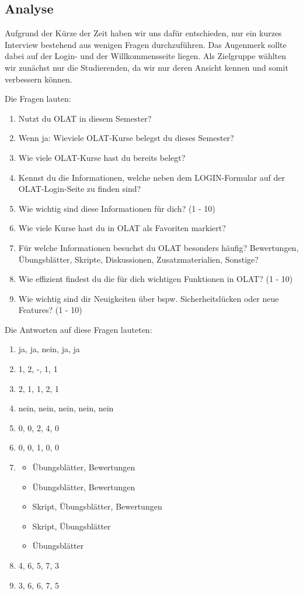 \documentclass[a4paper,10pt]{article}
\begin{document}
\kopf
\renewcommand{\figurename}{Figure}


\subsection{Analyse}
Aufgrund der Kürze der Zeit haben wir uns dafür entschieden, nur ein kurzes Interview bestehend aus wenigen Fragen durchzuführen. Das Augenmerk sollte dabei auf der Login- und der Willkommensseite liegen. Als Zielgruppe wählten wir zunächst nur die Studierenden, da wir nur deren Ansicht kennen und somit verbessern können.

Die Fragen lauten:
\begin{enumerate}
\item Nutzt du OLAT in diesem Semester?
\item Wenn ja: Wieviele OLAT-Kurse belegst du dieses Semester?
\item Wie viele OLAT-Kurse hast du bereits belegt?
\item Kennst du die Informationen, welche neben dem LOGIN-Formular auf der OLAT-Login-Seite zu finden sind?
\item Wie wichtig sind diese Informationen für dich? (1 - 10)
\item Wie viele Kurse hast du in OLAT als Favoriten markiert?
\item Für welche Informationen besuchst du OLAT besonders häufig? Bewertungen, Übungsblätter, Skripte, Diskussionen, Zusatzmaterialien, Sonstige?
\item Wie effizient findest du die für dich wichtigen Funktionen in OLAT? (1 - 10)
\item Wie wichtig sind dir Neuigkeiten über bspw. Sicherheitslücken oder neue Features? (1 - 10)
\end{enumerate}

Die Antworten auf diese Fragen lauteten:
\begin{enumerate}
\item ja, ja, nein, ja, ja
\item 1, 2, -, 1, 1
\item 2, 1, 1, 2, 1
\item nein, nein, nein, nein, nein
\item 0, 0, 2, 4, 0
\item 0, 0, 1, 0, 0
\item \begin{itemize}
    \item Übungsblätter, Bewertungen
    \item Übungsblätter, Bewertungen
    \item Skript, Übungsblätter, Bewertungen
    \item Skript, Übungsblätter
    \item Übungsblätter
\end{itemize}
\item 4, 6, 5, 7, 3
\item 3, 6, 6, 7, 5
\end{enumerate}
\end{document}
